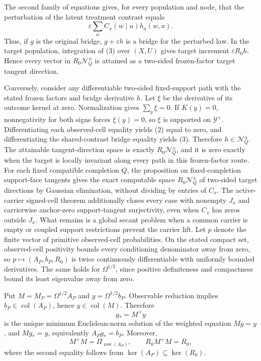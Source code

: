 The second family of equations gives, for every population and node, that the perturbation of the latent treatment contrast equals
\[
\varepsilon\sum_wC_x(w\mid u)h_a(w,x).
\tag{3}
\]
Thus, if \(g\) is the original bridge, \(g+\varepsilon h\) is a bridge for the perturbed law.  In the target population, integration of (3) over \((X,U)\) gives target increment \(\varepsilon R_0h\).  Hence every vector in \(R_0\mathcal N_Q^{\pm}\) is attained as a two-sided frozen-factor target tangent direction.

Conversely, consider any differentiable two-sided fixed-support path with the stated frozen factors and bridge derivative \(h\).  Let \(\xi\) be the derivative of its outcome kernel at zero.  Normalization gives \(\sum_y\xi=0\).  If \(K(y)=0\), nonnegativity for both signs forces \(\xi(y)=0\), so \(\xi\) is supported on \(\mathcal Y^+\).  Differentiating each observed-cell equality yields (2) equal to zero, and differentiating the shared-contrast bridge equality yields (3).  Therefore \(h\in\mathcal N_Q^{\pm}\).  The attainable tangent-direction space is exactly \(R_0\mathcal N_Q^{\pm}\), and it is zero exactly when the target is locally invariant along every path in this frozen-factor route.
For each fixed compatible completion \(Q\), the proposition on fixed-completion support-face tangents gives the exact computable space \(R_0\mathcal N_Q^{\pm}\) of two-sided target directions by Gaussian elimination, without dividing by entries of \(C_x\).  The active-carrier signed-cell theorem additionally closes every case with nonempty \(J_x\) and carrierwise anchor-zero support-tangent surjectivity, even when \(C_x\) has zeros outside \(J_x\).  What remains is a global secant problem when a common carrier is empty or coupled support restrictions prevent the carrier lift.
Let \(p\) denote the finite vector of primitive observed-cell probabilities.  On the stated compact set, observed-cell positivity bounds every conditioning denominator away from zero, so \(p\mapsto(A_P,b_P,R_0)\) is twice continuously differentiable with uniformly bounded derivatives.  The same holds for \(\Omega^{1/2}\), since positive definiteness and compactness bound its least eigenvalue away from zero.

Put \(M=M_P=\Omega^{1/2}A_P\) and \(y=\Omega^{1/2}b_P\).  Observable reduction implies \(b_P\in\operatorname{col}(A_P)\), hence \(y\in\operatorname{col}(M)\).  Therefore
\[
g_*=M^+y
\tag{1}
\]
is the unique minimum Euclidean-norm solution of the weighted equation \(Mg=y\), and \(Mg_*=y\), equivalently \(A_Pg_*=b_P\).  Moreover,
\[
M^+M=\Pi_{\operatorname{row}(A_P)},
\qquad R_0M^+M=R_0,
\tag{2}
\]
where the second equality follows from \(\ker(A_P)\subseteq\ker(R_0)\).

